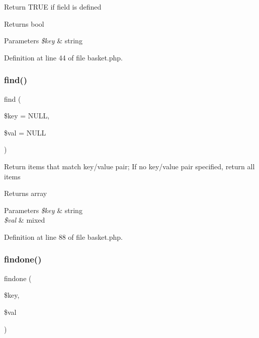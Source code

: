 Return T\+R\+UE if field is defined \begin{DoxyReturn}{Returns}
bool 
\end{DoxyReturn}

\begin{DoxyParams}{Parameters}
{\em \$key} & string \\
\hline
\end{DoxyParams}


Definition at line 44 of file basket.\+php.

\hypertarget{class_basket_ae24293a6c7fb1d109eb000b7f9db35c1}{}\label{class_basket_ae24293a6c7fb1d109eb000b7f9db35c1} 
\subsubsection{\texorpdfstring{find()}{find()}}
{\footnotesize\ttfamily find (\begin{DoxyParamCaption}\item[{}]{\$key = {\ttfamily NULL},  }\item[{}]{\$val = {\ttfamily NULL} }\end{DoxyParamCaption})}

Return items that match key/value pair; If no key/value pair specified, return all items \begin{DoxyReturn}{Returns}
array 
\end{DoxyReturn}

\begin{DoxyParams}{Parameters}
{\em \$key} & string \\
\hline
{\em \$val} & mixed \\
\hline
\end{DoxyParams}


Definition at line 88 of file basket.\+php.

\hypertarget{class_basket_ad9ce70d0a094124bff4adcec3df5e30f}{}\label{class_basket_ad9ce70d0a094124bff4adcec3df5e30f} 
\subsubsection{\texorpdfstring{findone()}{findone()}}
{\footnotesize\ttfamily findone (\begin{DoxyParamCaption}\item[{}]{\$key,  }\item[{}]{\$val }\end{DoxyParamCaption})}

